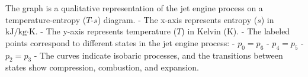 The graph is a qualitative representation of the jet engine process on a temperature-entropy (\( T \)-\( s \)) diagram.  
- The x-axis represents entropy (\( s \)) in \( \text{kJ}/\text{kg·K} \).  
- The y-axis represents temperature (\( T \)) in Kelvin (\( \text{K} \)).  
- The labeled points correspond to different states in the jet engine process:  
  - \( p_0 = p_6 \)  
  - \( p_4 = p_5 \)  
  - \( p_2 = p_3 \)  
- The curves indicate isobaric processes, and the transitions between states show compression, combustion, and expansion.